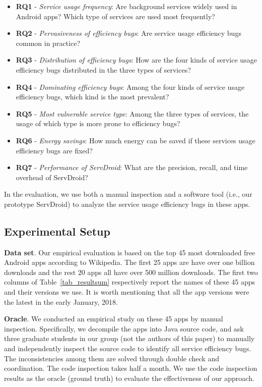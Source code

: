 \documentclass[conference]{IEEEtran}
\begin{document}
\begin{itemize}
\item {\bf RQ1} - {\it Service usage frequency}: Are background services widely
used in Android apps? Which type of services are used most frequently?
\item {\bf RQ2} - {\it Pervasiveness of efficiency bugs}: Are service usage efficiency bugs common in practice?
\item {\bf RQ3} - {\it Distribution of efficiency bugs}: How are the four kinds of service usage efficiency bugs distributed in the three types of services?
\item {\bf RQ4} - {\it Dominating efficiency bugs}: Among the four kinds of service usage efficiency bugs, which kind is the most prevalent?
\item {\bf RQ5} - {\it Most vulnerable service type}: Among the three types of services, the usage of which type is more prone to efficiency bugs?
\item {\bf RQ6} - {\it Energy savings}: How much energy can be saved if these
services usage efficiency bugs are fixed?
\item {\bf RQ7} - {\it Performance of \textsf{ServDroid}}: What are the
precision, recall, and time overhead of \textsf{ServDroid}?
\end{itemize}

In the evaluation, we use both a manual inspection and a software tool (i.e., our prototype \textsf{ServDroid}) to analyze the service usage efficiency bugs in these apps.


\subsection{Experimental Setup}
\textbf{Data set}. Our empirical evaluation is based on the top 45 most
downloaded free Android apps according to Wikipedia. The first 25 apps are have
over one billion downloads and the rest 20 apps all have over 500 million
downloads. The first two columns of Table~\ref{tab_resultsum} respectively
report the names of these 45 apps and their versions we use. It is worth
mentioning that all the app versions were the latest in the early January, 2018.

\textbf{Oracle}. We conducted an empirical study on these 45 apps by manual
inspection. Specifically, we decompile the apps into Java source code, and ask
three graduate students in our group (not the authors of this paper) to manually
and independently inspect the source code to identify all service efficiency
bugs. The inconsistencies among them are solved through double check and
coordination. The code inspection takes half a month. We use the code inspection
results as the oracle (ground truth) to evaluate the effectiveness of our approach.
\end{document}
